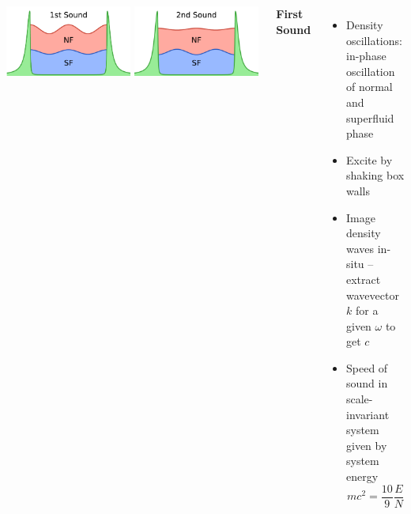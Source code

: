 \documentclass[26pt, paperwidth=36in,paperheight=48in]{tikzposter} %
\newcommand{\myfont}{\fontsize{24}{30}\selectfont}
\begin{document}
\begin{columns}
{\centering
\vspace{0.53cm}
\begin{minipage}{0.3\textwidth}
	\includegraphics[width=0.49\textwidth]{figures/first_sound_cartoon.pdf}
	\includegraphics[width=0.49\textwidth]{figures/second_sound_cartoon.pdf}
\end{minipage}
\vspace{0.55cm}
} 








\block[]{\textcolor{BEC1blue}{Density Response -- First Sound [2]}}
{
	\begin{minipage}{0.2\textwidth}
		\flushleft
		\vspace{0.5cm}
		\textbf{First Sound}
		\vspace{0.5cm}
		\myfont
		\begin{itemize}
			\item Density oscillations: in-phase oscillation of normal and superfluid phase
			
			\item Excite by shaking box walls
			
			\item Image density waves in-situ -- extract wavevector $k$ for a given $\omega$ to get $c$
			
			\item Speed of sound in scale-invariant system given by system energy $$mc^2 = \frac{10}{9} \frac{E}{N}$$
		\end{itemize}
		

\end{minipage}}
\end{columns}
\end{document}
